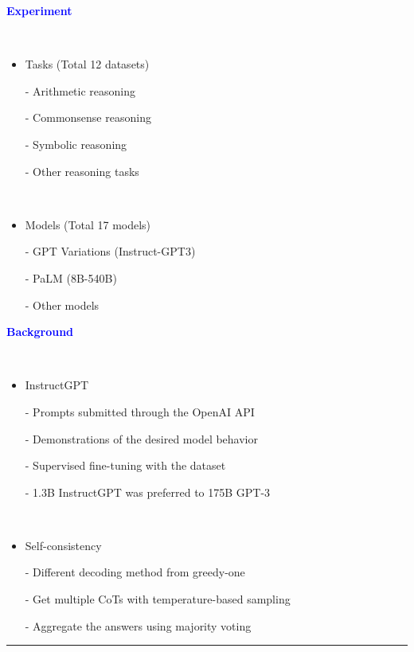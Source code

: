 \documentclass[professionalfont]{beamer}
\begin{document}
\begin{frame}

\begin{center}
    { \textbf{\textcolor{blue}{ {\fontsize{12}{14}\selectfont Experiment } }} }
\end{center}
\\[0.5cm]

{\fontsize{10}{14}\selectfont 
\begin{itemize}
    \item Tasks (Total 12 datasets)

    - Arithmetic reasoning

    - Commonsense reasoning

    - Symbolic reasoning

    - Other reasoning tasks

    \\[0.3cm]

    \item Models (Total 17 models)

    - GPT Variations (Instruct-GPT3)

    - PaLM (8B-540B)

    - Other models
\end{itemize}
}

\end{frame}

\begin{frame}
\begin{refsection}

\begin{center}
    { \textbf{\textcolor{blue}{ {\fontsize{12}{14}\selectfont Background } }} }
\end{center}
\\[0.1cm]

{\fontsize{10}{14}\selectfont 
\begin{itemize}
    \item InstructGPT \cite{instructgpt}

    - Prompts submitted through the OpenAI API

    - Demonstrations of the desired model behavior

    - Supervised fine-tuning with the dataset

    - 1.3B InstructGPT was preferred to 175B GPT-3

    \\[0.3cm]

    \item Self-consistency \cite{self_consistency}

    - Different decoding method from greedy-one

    - Get multiple CoTs with temperature-based sampling

    - Aggregate the answers using majority voting
\end{itemize}
}

\vspace{0.3cm}
\hrule
\printbibliography

\end{refsection}
\end{frame}
\end{document}
